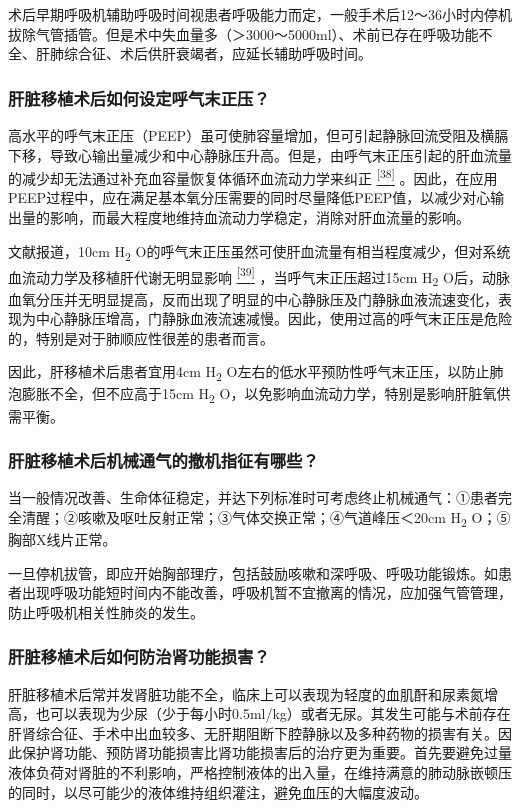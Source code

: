 术后早期呼吸机辅助呼吸时间视患者呼吸能力而定，一般手术后12～36小时内停机拔除气管插管。但是术中失血量多（＞3000～5000ml）、术前已存在呼吸功能不全、肝肺综合征、术后供肝衰竭者，应延长辅助呼吸时间。

\subsubsection{肝脏移植术后如何设定呼气末正压？}

高水平的呼气末正压（PEEP）虽可使肺容量增加，但可引起静脉回流受阻及横膈下移，导致心输出量减少和中心静脉压升高。但是，由呼气末正压引起的肝血流量的减少却无法通过补充血容量恢复体循环血流动力学来纠正
\protect\hyperlink{text00020.htmlux5cux23ch38-19}{\textsuperscript{{[}38{]}}}
。因此，在应用PEEP过程中，应在满足基本氧分压需要的同时尽量降低PEEP值，以减少对心输出量的影响，而最大程度地维持血流动力学稳定，消除对肝血流量的影响。

文献报道，10cm H\textsubscript{2}
O的呼气末正压虽然可使肝血流量有相当程度减少，但对系统血流动力学及移植肝代谢无明显影响
\protect\hyperlink{text00020.htmlux5cux23ch39-19}{\textsuperscript{{[}39{]}}}
，当呼气末正压超过15cm H\textsubscript{2}
O后，动脉血氧分压并无明显提高，反而出现了明显的中心静脉压及门静脉血液流速变化，表现为中心静脉压增高，门静脉血液流速减慢。因此，使用过高的呼气末正压是危险的，特别是对于肺顺应性很差的患者而言。

因此，肝移植术后患者宜用4cm H\textsubscript{2}
O左右的低水平预防性呼气末正压，以防止肺泡膨胀不全，但不应高于15cm
H\textsubscript{2} O，以免影响血流动力学，特别是影响肝脏氧供需平衡。

\subsubsection{肝脏移植术后机械通气的撤机指征有哪些？}

当一般情况改善、生命体征稳定，并达下列标准时可考虑终止机械通气：①患者完全清醒；②咳嗽及呕吐反射正常；③气体交换正常；④气道峰压＜20cm
H\textsubscript{2} O；⑤胸部X线片正常。

一旦停机拔管，即应开始胸部理疗，包括鼓励咳嗽和深呼吸、呼吸功能锻炼。如患者出现呼吸功能短时间内不能改善，呼吸机暂不宜撤离的情况，应加强气管管理，防止呼吸机相关性肺炎的发生。

\subsubsection{肝脏移植术后如何防治肾功能损害？}

肝脏移植术后常并发肾脏功能不全，临床上可以表现为轻度的血肌酐和尿素氮增高，也可以表现为少尿（少于每小时0.5ml/kg）或者无尿。其发生可能与术前存在肝肾综合征、手术中出血较多、无肝期阻断下腔静脉以及多种药物的损害有关。因此保护肾功能、预防肾功能损害比肾功能损害后的治疗更为重要。首先要避免过量液体负荷对肾脏的不利影响，严格控制液体的出入量，在维持满意的肺动脉嵌顿压的同时，以尽可能少的液体维持组织灌注，避免血压的大幅度波动。

